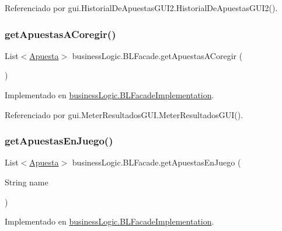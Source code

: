 Referenciado por gui.\+Historial\+De\+Apuestas\+G\+U\+I2.\+Historial\+De\+Apuestas\+G\+U\+I2().

\mbox{\label{interfacebusinessLogic_1_1BLFacade_a7cd14457ed6f9b5aaef992f780a51c20}} 
\subsubsection{\texorpdfstring{getApuestasACoregir()}{getApuestasACoregir()}}
{\footnotesize\ttfamily List$<$\mbox{\hyperlink{classdomain_1_1Apuesta}{Apuesta}}$>$ business\+Logic.\+B\+L\+Facade.\+get\+Apuestas\+A\+Coregir (\begin{DoxyParamCaption}{ }\end{DoxyParamCaption})}



Implementado en \mbox{\hyperlink{classbusinessLogic_1_1BLFacadeImplementation_af1218f1db76137f821a31adc31f47e9f}{business\+Logic.\+B\+L\+Facade\+Implementation}}.



Referenciado por gui.\+Meter\+Resultados\+G\+U\+I.\+Meter\+Resultados\+G\+U\+I().

\mbox{\label{interfacebusinessLogic_1_1BLFacade_ac88f2aca4613139544b5061d157b91a4}} 
\subsubsection{\texorpdfstring{getApuestasEnJuego()}{getApuestasEnJuego()}}
{\footnotesize\ttfamily List$<$\mbox{\hyperlink{classdomain_1_1Apuesta}{Apuesta}}$>$ business\+Logic.\+B\+L\+Facade.\+get\+Apuestas\+En\+Juego (\begin{DoxyParamCaption}\item[{String}]{name }\end{DoxyParamCaption})}



Implementado en \mbox{\hyperlink{classbusinessLogic_1_1BLFacadeImplementation_a5cf672ed1cbdef2446948fe5472e9da5}{business\+Logic.\+B\+L\+Facade\+Implementation}}.



